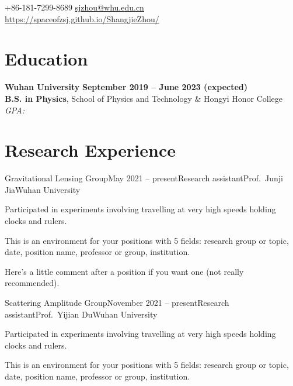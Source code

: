 \documentclass{resume}
\begin{document}
\begin{center}
    \contact
        {+86-181-7299-8689}
        {\href{mailto:sjzhou@whu.edu.cn}{sjzhou@whu.edu.cn}}
        {\href{https://spaceofzsj.github.io/ShangjieZhou/}{https://spaceofzsj.github.io/ShangjieZhou/}}
\end{center}

\section{Education} 
\begin{content}

    {\bf Wuhan University} \hfill {\bf September 2019 -- June 2023 (expected)} \\ 
    {\bf B.S. in Physics}, School of Physics and Technology \& Hongyi Honor College \hfill 
    {\em GPA: }
    
\sectionlineskip
\end{content}

\section{Research Experience}
\begin{content}

    \begin{position}{Gravitational Lensing Group}{May 2021 -- present}{Research assistant}{Prof.~Junji Jia}{Wuhan University}
    \item Participated in experiments involving travelling at very high speeds holding clocks and rulers.
    \item This is an environment for your positions with 5 fields: research group or topic, date, position name, professor or group, institution. 
    \end{position}
    \vspace{-.5\baselineskip}
    Here's a little comment after a position if you want one (not really recommended).

    \begin{position}{Scattering Amplitude Group}{November 2021 -- present}{Research assistant}{Prof.~Yijian Du}{Wuhan University}
    \item Participated in experiments involving travelling at very high speeds holding clocks and rulers.
    \item This is an environment for your positions with 5 fields: research group or topic, date, position name, professor or group, institution. 
    \end{position}
    \vspace{-.5\baselineskip}

\sectionlineskip
\end{content}
\vspace{-3\medskipamount}
\end{document}
